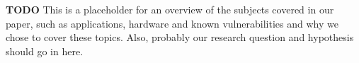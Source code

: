 \textbf{TODO}
This is a placeholder for an overview of the subjects covered in our paper, such as applications, hardware and known vulnerabilities and why we chose to cover these topics.
Also, probably our research question and hypothesis should go in here.




